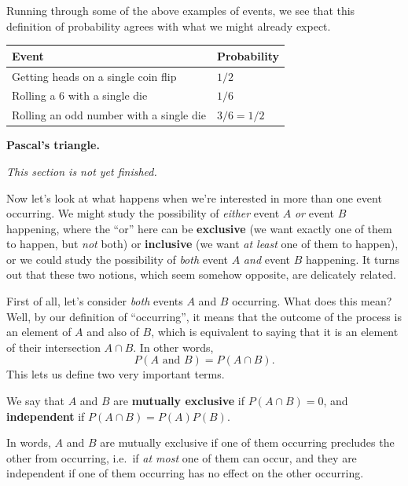 \documentclass[fleqn,a4paper]{article}
\newenvironment{idea}{\everypar{\setlength{\parindent}{1.5em}}}{}
\newenvironment{technical}[1]{\textbf{#1.}\par\vspace{.5\baselineskip}\everypar{\setlength{\parindent}{1.5em}}}{}
\newenvironment{todo}{\color{primary}\emph{This section is not yet finished.}}{}
\theoremstyle{definition}
\theoremstyle{definition}
\theoremstyle{definition}
\theoremstyle{definition}
\theoremstyle{remark}
\begin{document}
Running through some of the above examples of events, we see that this definition of probability agrees with what we might already expect.

\begin{longtable}[]{@{}ll@{}}
\toprule()
\textbf{Event} & \textbf{Probability} \\
\midrule()
\endhead
Getting heads on a single coin flip & \(1/2\) \\
Rolling a 6 with a single die & \(1/6\) \\
Rolling an odd number with a single die & \(3/6=1/2\) \\
\bottomrule()
\end{longtable}

\begin{technical}{Pascal's triangle}

\begin{todo}

\end{todo}

\end{technical}

Now let's look at what happens when we're interested in more than one event occurring.
We might study the possibility of \emph{either} event \(A\) \emph{or} event \(B\) happening, where the ``or'' here can be \textbf{exclusive} (we want exactly one of them to happen, but \emph{not} both) or \textbf{inclusive} (we want \emph{at least} one of them to happen), or we could study the possibility of \emph{both} event \(A\) \emph{and} event \(B\) happening.
It turns out that these two notions, which seem somehow opposite, are delicately related.

First of all, let's consider \emph{both} events \(A\) and \(B\) occurring.
What does this mean?
Well, by our definition of ``occurring'', it means that the outcome of the process is an element of \(A\) and also of \(B\), which is equivalent to saying that it is an element of their intersection \(A\cap B\).
In other words,
\[
  P(A\text{ and }B)
  = P(A\cap B).
\]
This lets us define two very important terms.

\begin{idea}
We say that \(A\) and \(B\) are \textbf{mutually exclusive} if \(P(A\cap B)=0\), and \textbf{independent} if \(P(A\cap B)=P(A)P(B)\).

In words, \(A\) and \(B\) are mutually exclusive if one of them occurring precludes the other from occurring, i.e.~if \emph{at most} one of them can occur, and they are independent if one of them occurring has no effect on the other occurring.

\end{idea}
\end{document}

